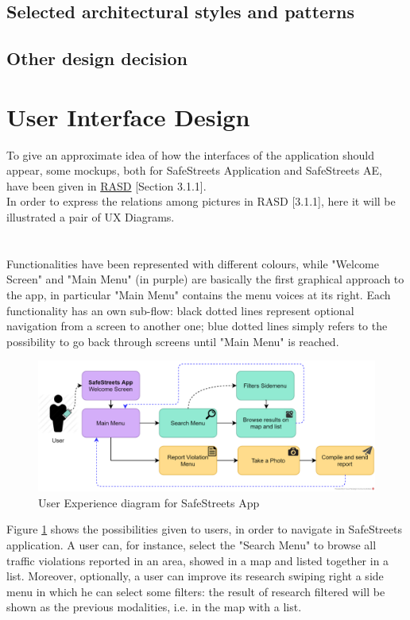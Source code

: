 \documentclass{article}
\begin{document}
		\subsection{Selected architectural styles and patterns}
		\subsection{Other design decision}
	\clearpage	
	\section{User Interface Design}
		To give an approximate idea of how the interfaces of the application should appear, some mockups, both for SafeStreets Application and SafeStreets AE, have been given in \href{run:d:../DeliveryFolder/RASD1.pdf}{RASD} [Section 3.1.1].\\ 
		In order to express the relations among pictures in RASD [3.1.1], here it will be illustrated a pair of UX Diagrams.
		\\\\\\
		Functionalities have been represented with different colours, while "Welcome Screen" and "Main Menu" (in purple) are basically the first graphical approach to the app, in particular "Main Menu" contains the menu voices at its right.
		Each functionality has an own sub-flow: black dotted lines represent optional navigation from a screen to another one; blue dotted lines simply refers to the possibility to go back through screens until "Main Menu" is reached.
		
		\begin{figure}[H]
			\centering
			\includegraphics[width=1\textwidth]{diagrams/UXSafeStreetsApp.png}
			\caption[User Experience diagram for SafeStreets App]{User Experience diagram for SafeStreets App}
			\label{fig:UX_SSApp}
		\end{figure}
	
		Figure \ref{fig:UX_SSApp} shows the possibilities given to users, in order to navigate in SafeStreets application. A user can, for instance, select the "Search Menu" to browse all traffic violations reported in an area, showed in a map and listed together in a list.
		Moreover, optionally, a user can improve its research swiping right a side menu in which he can select some filters: the result of research filtered will be shown as the previous modalities, i.e. in the map with a list.
	
\end{document}

